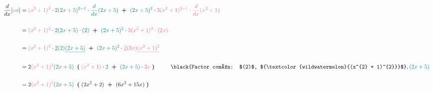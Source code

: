 \documentclass[12pt]{article}
\begin{document}
\begin{equation*}
    \begin{split}
       \frac{d}{dx} {\Large{[}}{\textcolor{wildwatermelon}{u}} {\textcolor{tealgreen}{v}}{\Large{]}} & = {\textcolor{wildwatermelon}{(x^{2} + 1)^{3}}} \cdot {\textcolor{tealgreen}{2(2x+5)^{2-1}\cdot \frac{d}{dx}(2x+5)}} \hspace{0.2cm} {\textbf{+}} \hspace{0.2cm} {\textcolor{tealgreen}{(2x+5)^{2}}} \cdot {\textcolor{wildwatermelon}{3(x^{2} +1)^{3-1}\cdot \frac{d}{dx}(x^{2}+1)}}\\\\ 
        & = {\textcolor{wildwatermelon}{(x^{2} + 1)^{3}}} \cdot {\textcolor{tealgreen}{2(2x+5) \cdot (2) }} \hspace{0.2cm} {\textbf{+}} \hspace{0.2cm} {\textcolor{tealgreen}{(2x+5)^{2}}} \cdot {\textcolor{wildwatermelon}{3(x^{2} + 1)^{2}\cdot (2x)}} \\\\
         & = {\textcolor{wildwatermelon}{(x^{2} + 1)^{3}}} \cdot {\textcolor{tealgreen}{{\underline{2}}(2){\underline{(2x+5)}}}} \hspace{0.2cm} {\textbf{+}} \hspace{0.2cm} {\textcolor{tealgreen}{(2x+5)^{2}}} \cdot {\textcolor{wildwatermelon}{{\underline{2}}(3x){\underline{(x^{2} + 1)^{2}}}}}\\\\ 
         & = 2 {\textcolor{wildwatermelon}{(x^{2} + 1)^{2}}} {\textcolor{tealgreen}{(2x+5)}} \hspace{0.2cm} {\textbf{(}}\hspace{0.1cm}{\textcolor{wildwatermelon}{(x^{2} + 1)}} \cdot {\textcolor{tealgreen}{2}} \hspace{0.2cm} {\textbf{+}} \hspace{0.2cm} {\textcolor{tealgreen}{(2x+5)}} \cdot {\textcolor{wildwatermelon}{3x}}\hspace{0.1cm}{\textbf{)}} \hspace{1 cm} \textup{\black{Factor común: $(2)$, ${\textcolor{wildwatermelon}{(x^{2} + 1)^{2}}}$}}, {\textcolor{tealgreen}{(2x+5)}}\\\\
         & = 2 {\textcolor{wildwatermelon}{(x^{2} + 1)^{2}}} {\textcolor{tealgreen}{(2x+5)}} \hspace{0.2cm} {\textbf{(}}\hspace{0.1cm}(2x^{2} + 2) \hspace{0.2cm} {\textbf{+}} \hspace{0.2cm} (6x^{2}+15x)\hspace{0.1cm}{\textbf{)}}\\\\

\end{split}
\end{equation*}
\end{document}
